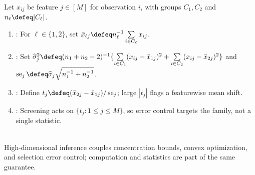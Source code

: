 \begin{method} \label{meth:featurewise-two-sample-high-dimensional-screening} \\
Let $x_{ij}$ be feature $j\in[M]$ for observation $i$, with groups $C_1,C_2$ and $n_\ell\defeq|C_\ell|$.
\begin{enumerate}[label=(\roman*)]
\setlength{\itemsep}{0pt}
\item {}: For $\ell\in\{1,2\}$, set $\bar{x}_{\ell j}\defeq n_\ell^{-1}\sum\limits_{i\in C_\ell}x_{ij}$.
\item {}: Set $\widehat{\sigma}_j^2\defeq(n_1+n_2-2)^{-1}\{\sum\limits_{i\in C_1}(x_{ij}-\bar{x}_{1j})^2+\sum\limits_{i\in C_2}(x_{ij}-\bar{x}_{2j})^2\}$ and $\operatorname{se}_j\defeq\widehat{\sigma}_j\sqrt{n_1^{-1}+n_2^{-1}}$.
\item {}: Define $t_j\defeq(\bar{x}_{2j}-\bar{x}_{1j})/\operatorname{se}_j$; large $|t_j|$ flags a featurewise mean shift.
\item {}: Screening acts on $\{t_j:1\leq j\leq M\}$, so error control targets the family, not a single statistic.
\end{enumerate}
\end{method}

\begin{remark} \label{rem:high-dimensional-cross-reference-optimization} \\
High-dimensional inference couples concentration bounds, convex optimization, and selection error control; computation and statistics are part of the same guarantee.
\end{remark}
